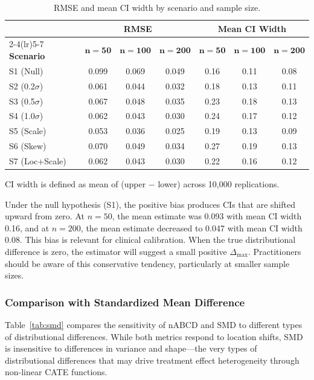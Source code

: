 \documentclass[AMA,Times1COL]{WileyNJDv5}
\begin{document}
\begin{table}[ht]
\centering
\caption{RMSE and mean CI width by scenario and sample size.\label{tab:precision}}
\begin{tabular}{lcccccc}
\toprule
& \multicolumn{3}{c}{\textbf{RMSE}} & \multicolumn{3}{c}{\textbf{Mean CI Width}} \\
\cmidrule(lr){2-4}\cmidrule(lr){5-7}
\textbf{Scenario} & $\boldsymbol{n=50}$ & $\boldsymbol{n=100}$ & $\boldsymbol{n=200}$ & $\boldsymbol{n=50}$ & $\boldsymbol{n=100}$ & $\boldsymbol{n=200}$ \\
\midrule
S1 (Null) & 0.099 & 0.069 & 0.049 & 0.16 & 0.11 & 0.08 \\
S2 (0.2$\sigma$) & 0.061 & 0.044 & 0.032 & 0.18 & 0.13 & 0.11 \\
S3 (0.5$\sigma$) & 0.067 & 0.048 & 0.035 & 0.23 & 0.18 & 0.13 \\
S4 (1.0$\sigma$) & 0.062 & 0.043 & 0.030 & 0.24 & 0.17 & 0.12 \\
S5 (Scale) & 0.053 & 0.036 & 0.025 & 0.19 & 0.13 & 0.09 \\
S6 (Skew) & 0.070 & 0.049 & 0.034 & 0.27 & 0.19 & 0.13 \\
S7 (Loc+Scale) & 0.062 & 0.043 & 0.030 & 0.22 & 0.16 & 0.12 \\
\bottomrule
\end{tabular}
\begin{tablenotes}
\item CI width is defined as mean of (upper $-$ lower) across 10{,}000 replications.
\end{tablenotes}
\end{table}

Under the null hypothesis (S1), the positive bias produces CIs that are shifted upward from zero. At $n = 50$, the mean estimate was 0.093 with mean CI width 0.16, and at $n = 200$, the mean estimate decreased to 0.047 with mean CI width 0.08. This bias is relevant for clinical calibration. When the true distributional difference is zero, the estimator will suggest a small positive $\Delta_{\max}$. Practitioners should be aware of this conservative tendency, particularly at smaller sample sizes.

\subsubsection{Comparison with Standardized Mean Difference}

Table~\ref{tab:smd} compares the sensitivity of nABCD and SMD to different types of distributional differences. While both metrics respond to location shifts, SMD is insensitive to differences in variance and shape---the very types of distributional differences that may drive treatment effect heterogeneity through non-linear CATE functions.
\end{document}
